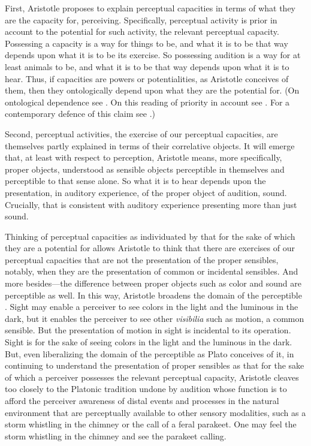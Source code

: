 First, Aristotle proposes to explain perceptual capacities in terms of what they are the capacity for, perceiving.  Specifically, perceptual activity is prior in account to the potential for such activity, the relevant perceptual capacity. Possessing a capacity is a way for things to be, and what it is to be that way depends upon what it is to be its exercise. So possessing audition is a way for at least animals to be, and what it is to be that way depends upon what it is to hear. Thus, if capacities are powers or potentialities, as Aristotle conceives of them, then they ontologically depend upon what they are the potential for. (On ontological dependence see \citealt{Fine:1995ls}. On this reading of priority in account see \citealt{Peramatzis:2011aa}. For a contemporary defence of this claim see \citealt{Kalderon:2012fk}.) 

Second, perceptual activities, the exercise of our perceptual capacities, are themselves partly explained in terms of their correlative objects. It will emerge that, at least with respect to perception, Aristotle means, more specifically, proper objects, understood as sensible objects perceptible in themselves and perceptible to that sense alone. So what it is to hear depends upon the presentation, in auditory experience, of the proper object of audition, sound. Crucially, that is consistent with auditory experience presenting more than just sound.

Thinking of perceptual capacities as individuated by that for the sake of which they are a potential for allows Aristotle to think that there are exercises of our perceptual capacities that are not the presentation of the proper sensibles, notably, when they are the presentation of common or incidental sensibles. And more besides---the difference between proper objects such as color and sound are perceptible as well. In this way, Aristotle broadens the domain of the perceptible \citep{Sorabji:1971fr,Sorabji:2003fk}. Sight may enable a perceiver to see colors in the light and the luminous in the dark, but it enables the perceiver to see other \emph{visibilia} such as motion, a common sensible. But the presentation of motion in sight is incidental to its operation. Sight is for the sake of seeing colors in the light and the luminous in the dark. But, even liberalizing the domain of the perceptible as Plato conceives of it, in continuing to understand the presentation of proper sensibles as that for the sake of which a perceiver possesses the relevant perceptual capacity, Aristotle cleaves too closely to the Platonic tradition undone by audition whose function is to afford the perceiver awareness of distal events and processes in the natural environment that are perceptually available to other sensory modalities, such as a storm whistling in the chimney or the call of a feral parakeet. One may feel the storm whistling in the chimney and see the parakeet calling.

